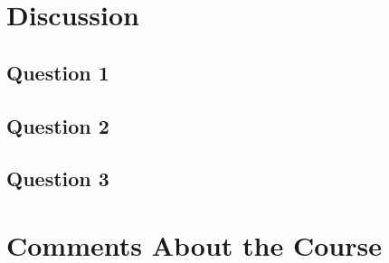 \documentclass[a4paper]{scrartcl}
\begin{document}
\section{Discussion}

\subsection{Question 1}

\subsection{Question 2}

\subsection{Question 3}

\section{Comments About the Course}
\end{document}

